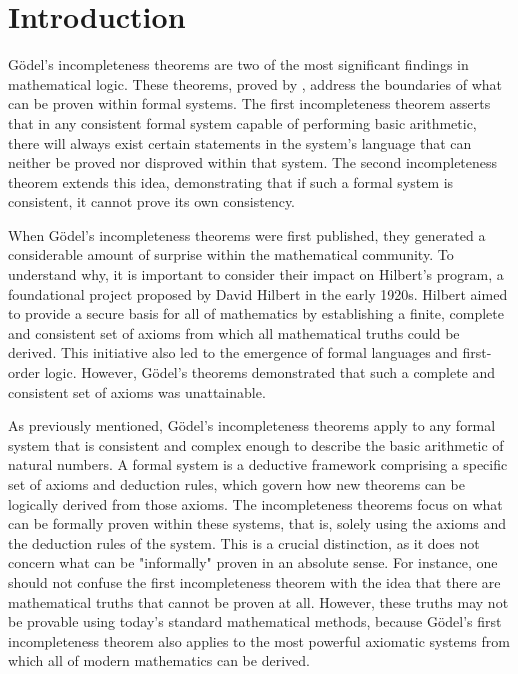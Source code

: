 \chapter*{Introduction}

Gödel’s incompleteness theorems are two of the most significant findings in mathematical logic. 
These theorems, proved by \cite{godel1931formal},
address the boundaries of what can be proven within formal systems. 
The first incompleteness theorem asserts that in any consistent formal system
capable of performing basic arithmetic, 
there will always exist certain statements in the system's language that can neither be proved
nor disproved within that system. 
The second incompleteness theorem extends this idea, 
demonstrating that if such a formal system is consistent, it cannot prove its own consistency.

When Gödel's incompleteness theorems were first published, 
they generated a considerable amount of surprise within the mathematical community. 
To understand why, it is important to consider their impact on Hilbert's program, 
a foundational project proposed by David Hilbert in the early 1920s. 
Hilbert aimed to provide a secure basis for all of mathematics by establishing a 
finite, complete and consistent set of axioms from which all mathematical truths could be derived. 
This initiative also led to the emergence of formal languages and first-order logic. 
However, Gödel's theorems demonstrated that such a complete and consistent set of axioms 
was unattainable.

As previously mentioned, Gödel's incompleteness theorems apply to any formal system 
that is consistent and complex enough to describe the basic arithmetic of natural numbers. 
A formal system is a deductive framework comprising a specific set of axioms and deduction rules, 
which govern how new theorems can be logically derived from those axioms.
The incompleteness theorems focus on what can be formally proven within these systems, that is,
solely using the axioms and the deduction rules of the system.
This is a crucial distinction, as it does not concern what can be "informally" proven
in an absolute sense.
For instance, one should not confuse the first incompleteness theorem with the idea that
there are mathematical truths that cannot be proven at all.
However, these truths may not be provable using today's standard mathematical methods, 
because Gödel's first incompleteness theorem also applies to the most powerful axiomatic systems 
from which all of modern mathematics can be derived.


